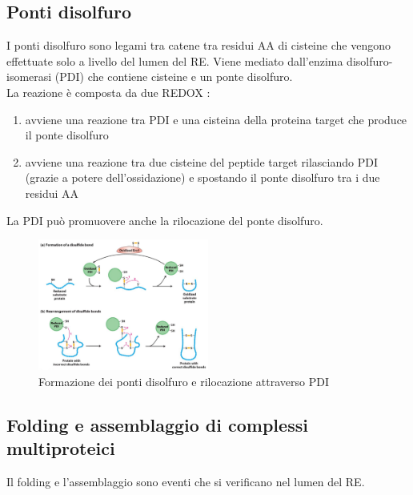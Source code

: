     \subsection{Ponti disolfuro}
        I ponti disolfuro sono legami tra catene tra residui AA di cisteine che vengono effettuate solo a livello del lumen del RE.
        Viene mediato dall'enzima disolfuro-isomerasi (PDI) che contiene cisteine e un ponte disolfuro. \\
        La reazione è composta da due REDOX :
        \begin{enumerate}
            \item avviene una reazione tra PDI e una cisteina della proteina target che produce il ponte disolfuro
            \item avviene una reazione tra due cisteine del peptide target rilasciando PDI (grazie a potere dell'ossidazione) e spostando il ponte disolfuro tra i due residui AA
        \end{enumerate}
        La PDI può promuovere anche la rilocazione del ponte disolfuro.\\

        \begin{figure}[h]
            \centering
            \includegraphics[width=0.5\textwidth]{images/pontiDisolfuro.JPG}
            \caption{\small Formazione dei ponti disolfuro e rilocazione attraverso PDI}
            \label{fig:mesh1}
        \end{figure}
        
    \subsection{Folding e assemblaggio di complessi multiproteici}
        Il folding e l'assemblaggio sono eventi che si verificano nel lumen del RE. 
